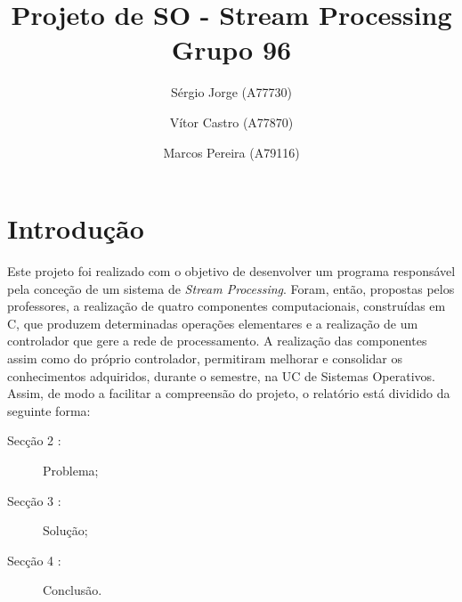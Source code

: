 \documentclass[a4paper]{article}
\title{Projeto de SO - Stream Processing\\Grupo 96}
\author{Sérgio Jorge (A77730) \and Vítor Castro (A77870) \and Marcos Pereira (A79116)}
\date{}
\begin{document}
\maketitle

\begin{abstract}
\end{abstract}

\tableofcontents

\section{Introdução}
\label{sec:intro}

Este projeto foi realizado com o objetivo de desenvolver um programa responsável pela conceção de um sistema de \textit{Stream Processing}. Foram, então, propostas pelos professores, a realização de quatro componentes computacionais, construídas em C, que produzem determinadas operações elementares e a realização de um controlador que gere a rede de processamento. A realização das componentes assim como do próprio controlador, permitiram melhorar e consolidar os conhecimentos adquiridos, durante o semestre, na UC de Sistemas Operativos.
Assim, de modo a facilitar a compreensão do projeto, o relatório está dividido da seguinte forma:


\begin{description}
    \item[Secção 2 :] Problema;
    \item[Secção 3 :] Solução;
    \item[Secção 4 :] Conclusão.
\end{description}
\pagebreak
\end{document}
